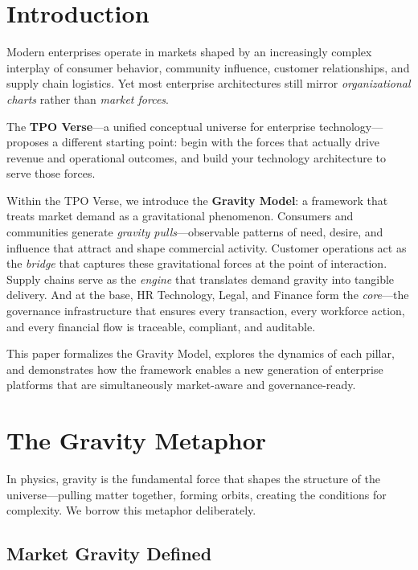 \documentclass[11pt,a4paper,twocolumn]{article}
\begin{document}
\section{Introduction}
\label{sec:introduction}

Modern enterprises operate in markets shaped by an increasingly complex interplay of consumer behavior, community influence, customer relationships, and supply chain logistics. Yet most enterprise architectures still mirror \textit{organizational charts} rather than \textit{market forces}.

The \textbf{TPO Verse}---a unified conceptual universe for enterprise technology---proposes a different starting point: begin with the forces that actually drive revenue and operational outcomes, and build your technology architecture to serve those forces.

Within the TPO Verse, we introduce the \textbf{Gravity Model}: a framework that treats market demand as a gravitational phenomenon. Consumers and communities generate \textit{gravity pulls}---observable patterns of need, desire, and influence that attract and shape commercial activity. Customer operations act as the \textit{bridge} that captures these gravitational forces at the point of interaction. Supply chains serve as the \textit{engine} that translates demand gravity into tangible delivery. And at the base, HR Technology, Legal, and Finance form the \textit{core}---the governance infrastructure that ensures every transaction, every workforce action, and every financial flow is traceable, compliant, and auditable.

This paper formalizes the Gravity Model, explores the dynamics of each pillar, and demonstrates how the framework enables a new generation of enterprise platforms that are simultaneously market-aware and governance-ready.


\section{The Gravity Metaphor}
\label{sec:metaphor}

In physics, gravity is the fundamental force that shapes the structure of the universe---pulling matter together, forming orbits, creating the conditions for complexity. We borrow this metaphor deliberately.

\subsection{Market Gravity Defined}
\end{document}
